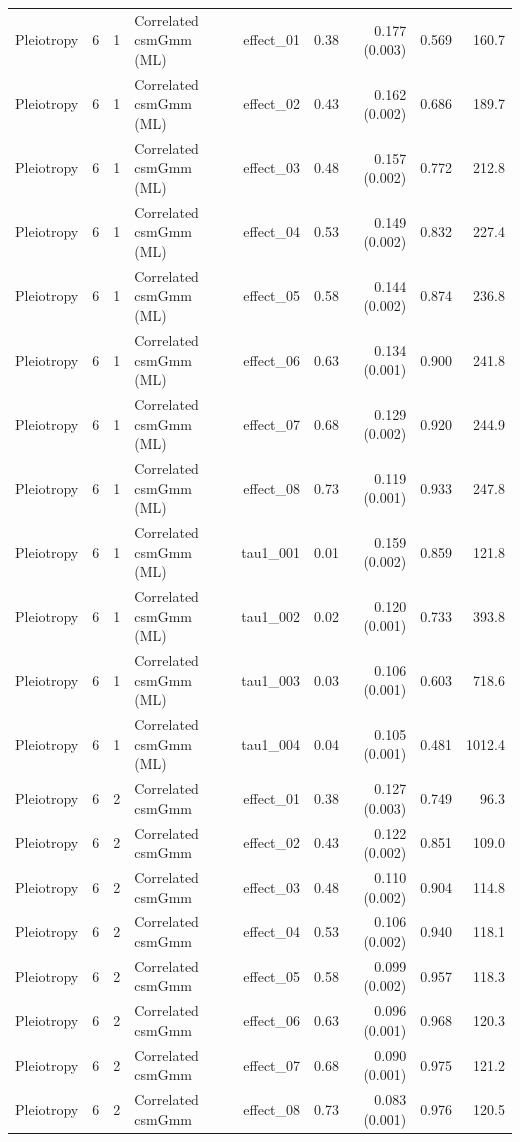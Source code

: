 \begin{longtable}{lcclrrrrr}
Pleiotropy & 6 & 1 & Correlated csmGmm (ML) & effect\_01 & 0.38 & 0.177 (0.003) & 0.569 & 160.7\\
Pleiotropy & 6 & 1 & Correlated csmGmm (ML) & effect\_02 & 0.43 & 0.162 (0.002) & 0.686 & 189.7\\
Pleiotropy & 6 & 1 & Correlated csmGmm (ML) & effect\_03 & 0.48 & 0.157 (0.002) & 0.772 & 212.8\\
Pleiotropy & 6 & 1 & Correlated csmGmm (ML) & effect\_04 & 0.53 & 0.149 (0.002) & 0.832 & 227.4\\
Pleiotropy & 6 & 1 & Correlated csmGmm (ML) & effect\_05 & 0.58 & 0.144 (0.002) & 0.874 & 236.8\\
Pleiotropy & 6 & 1 & Correlated csmGmm (ML) & effect\_06 & 0.63 & 0.134 (0.001) & 0.900 & 241.8\\
Pleiotropy & 6 & 1 & Correlated csmGmm (ML) & effect\_07 & 0.68 & 0.129 (0.002) & 0.920 & 244.9\\
Pleiotropy & 6 & 1 & Correlated csmGmm (ML) & effect\_08 & 0.73 & 0.119 (0.001) & 0.933 & 247.8\\
Pleiotropy & 6 & 1 & Correlated csmGmm (ML) & tau1\_001 & 0.01 & 0.159 (0.002) & 0.859 & 121.8\\
Pleiotropy & 6 & 1 & Correlated csmGmm (ML) & tau1\_002 & 0.02 & 0.120 (0.001) & 0.733 & 393.8\\
Pleiotropy & 6 & 1 & Correlated csmGmm (ML) & tau1\_003 & 0.03 & 0.106 (0.001) & 0.603 & 718.6\\
Pleiotropy & 6 & 1 & Correlated csmGmm (ML) & tau1\_004 & 0.04 & 0.105 (0.001) & 0.481 & 1012.4\\
Pleiotropy & 6 & 2 & Correlated csmGmm & effect\_01 & 0.38 & 0.127 (0.003) & 0.749 & 96.3\\
Pleiotropy & 6 & 2 & Correlated csmGmm & effect\_02 & 0.43 & 0.122 (0.002) & 0.851 & 109.0\\
Pleiotropy & 6 & 2 & Correlated csmGmm & effect\_03 & 0.48 & 0.110 (0.002) & 0.904 & 114.8\\
Pleiotropy & 6 & 2 & Correlated csmGmm & effect\_04 & 0.53 & 0.106 (0.002) & 0.940 & 118.1\\
Pleiotropy & 6 & 2 & Correlated csmGmm & effect\_05 & 0.58 & 0.099 (0.002) & 0.957 & 118.3\\
Pleiotropy & 6 & 2 & Correlated csmGmm & effect\_06 & 0.63 & 0.096 (0.001) & 0.968 & 120.3\\
Pleiotropy & 6 & 2 & Correlated csmGmm & effect\_07 & 0.68 & 0.090 (0.001) & 0.975 & 121.2\\
Pleiotropy & 6 & 2 & Correlated csmGmm & effect\_08 & 0.73 & 0.083 (0.001) & 0.976 & 120.5\\

\end{longtable}
